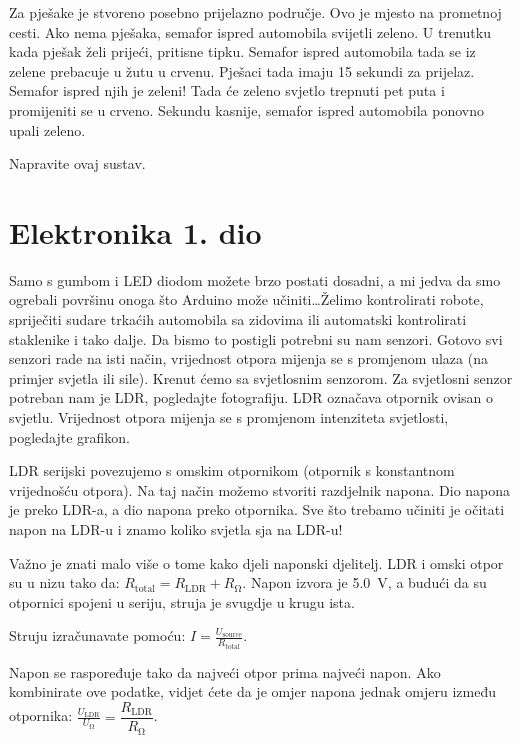 \documentclass{arduino}
\begin{document}
Za pješake je stvoreno posebno prijelazno područje. Ovo je mjesto na prometnoj cesti. Ako nema pješaka, semafor ispred automobila svijetli zeleno. U trenutku kada pješak želi prijeći, pritisne tipku. Semafor ispred automobila tada se iz zelene prebacuje u žutu u crvenu. Pješaci tada imaju 15 sekundi za prijelaz. Semafor ispred njih je zeleni! Tada će zeleno svjetlo trepnuti pet puta i promijeniti se u crveno. Sekundu kasnije, semafor ispred automobila ponovno upali zeleno.

Napravite ovaj sustav.

\newpage

\section{Elektronika 1. dio}



Samo s gumbom i LED diodom možete brzo postati dosadni, a mi jedva da smo ogrebali površinu onoga što Arduino može učiniti\dots Želimo kontrolirati robote, spriječiti sudare trkaćih automobila sa zidovima ili automatski kontrolirati staklenike i tako dalje. Da bismo to postigli potrebni su nam senzori. Gotovo svi senzori rade na isti način, vrijednost otpora mijenja se s promjenom ulaza (na primjer svjetla ili sile). Krenut ćemo sa svjetlosnim senzorom. Za svjetlosni senzor potreban nam je LDR, pogledajte fotografiju. LDR označava otpornik ovisan o svjetlu. Vrijednost otpora mijenja se s promjenom intenziteta svjetlosti, pogledajte grafikon.


LDR serijski povezujemo s omskim otpornikom (otpornik s konstantnom vrijednošću otpora). Na taj način možemo stvoriti razdjelnik napona. Dio napona je preko LDR-a, a dio napona preko otpornika. Sve što trebamo učiniti je očitati napon na LDR-u i znamo koliko svjetla sja na LDR-u!

Važno je znati malo više o tome kako djeli naponski djelitelj. LDR i omski otpor su u nizu tako da: $ R_\mathrm{total} = R_\mathrm{LDR} + R_{\si{\ohm}} $. Napon izvora je \SI{5,0}{\volt}, a budući da su otpornici spojeni u seriju, struja je svugdje u krugu ista.

Struju izračunavate pomoću: $ I = \frac{U_\mathrm{source}}{R_\mathrm{total}} $. 

Napon se raspoređuje tako da najveći otpor prima najveći napon. Ako kombinirate ove podatke, vidjet ćete da je omjer napona jednak omjeru između otpornika: $ \frac{U_\mathrm{LDR}}{U _ {\si{\ohm}}} = \dfrac{R_\mathrm{LDR}}{R_{\si{\ohm}}} $.
\end{document}
